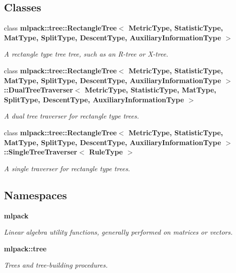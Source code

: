 \subsection*{Classes}
\begin{DoxyCompactItemize}
\item 
class {\bf mlpack\+::tree\+::\+Rectangle\+Tree$<$ Metric\+Type, Statistic\+Type, Mat\+Type, Split\+Type, Descent\+Type, Auxiliary\+Information\+Type $>$}
\begin{DoxyCompactList}\small\item\em A rectangle type tree tree, such as an R-\/tree or X-\/tree. \end{DoxyCompactList}\item 
class {\bf mlpack\+::tree\+::\+Rectangle\+Tree$<$ Metric\+Type, Statistic\+Type, Mat\+Type, Split\+Type, Descent\+Type, Auxiliary\+Information\+Type $>$\+::\+Dual\+Tree\+Traverser$<$ Metric\+Type, Statistic\+Type, Mat\+Type, Split\+Type, Descent\+Type, Auxiliary\+Information\+Type $>$}
\begin{DoxyCompactList}\small\item\em A dual tree traverser for rectangle type trees. \end{DoxyCompactList}\item 
class {\bf mlpack\+::tree\+::\+Rectangle\+Tree$<$ Metric\+Type, Statistic\+Type, Mat\+Type, Split\+Type, Descent\+Type, Auxiliary\+Information\+Type $>$\+::\+Single\+Tree\+Traverser$<$ Rule\+Type $>$}
\begin{DoxyCompactList}\small\item\em A single traverser for rectangle type trees. \end{DoxyCompactList}\end{DoxyCompactItemize}
\subsection*{Namespaces}
\begin{DoxyCompactItemize}
\item 
 {\bf mlpack}
\begin{DoxyCompactList}\small\item\em Linear algebra utility functions, generally performed on matrices or vectors. \end{DoxyCompactList}\item 
 {\bf mlpack\+::tree}
\begin{DoxyCompactList}\small\item\em Trees and tree-\/building procedures. \end{DoxyCompactList}\end{DoxyCompactItemize}
